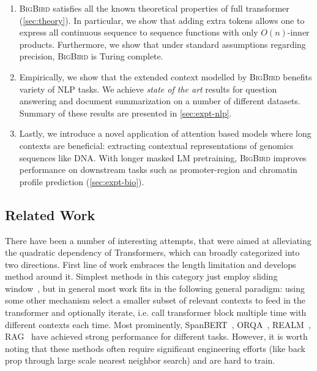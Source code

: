 \begin{enumerate}[leftmargin=6mm, itemsep=2mm, partopsep=0pt,parsep=0pt]
    \item 
    \textsc{BigBird} satisfies all the known theoretical properties of full transformer (\ref{sec:theory}). In particular, we show that adding extra tokens allows one to express all continuous sequence to sequence functions with only $O(n)$-inner products. Furthermore, we show that under standard assumptions regarding precision, \textsc{BigBird} is Turing complete.

    \item 
    Empirically, we show that the extended context modelled by \textsc{BigBird} benefits variety of NLP tasks. We achieve \emph{state of the art} results for  question answering and document summarization on a number of different datasets. Summary of these results are presented in \ref{sec:expt-nlp}.

    \item
    Lastly, we introduce a novel application of attention based models where long contexts are beneficial: extracting contextual representations of genomics sequences like DNA. With longer masked LM pretraining, \textsc{BigBird} improves performance on downstream tasks such as promoter-region and chromatin profile prediction (\ref{sec:expt-bio}). 
\end{enumerate}

\subsection{Related Work} There have been a number of interesting attempts, that were aimed at alleviating the quadratic dependency of Transformers, which can broadly categorized into two directions. First line of work embraces the length limitation and develops method around it. Simplest methods in this category just employ sliding window~\citep{wang2019multi}, but in general most work fits in the following general paradigm: using some other mechanism select a smaller subset of relevant contexts to feed in the transformer and optionally iterate, i.e. call transformer block multiple time with different contexts each time. Most prominently, SpanBERT~\citep{joshi2020spanbert}, ORQA~\citep{lee2019latent}, REALM~\citep{guu2020realm}, RAG~\citep{lewis2020retrieval} have achieved strong performance for different tasks. However, it is worth noting that these methods often require significant engineering efforts (like back prop through large scale nearest neighbor search) and are hard to train.

